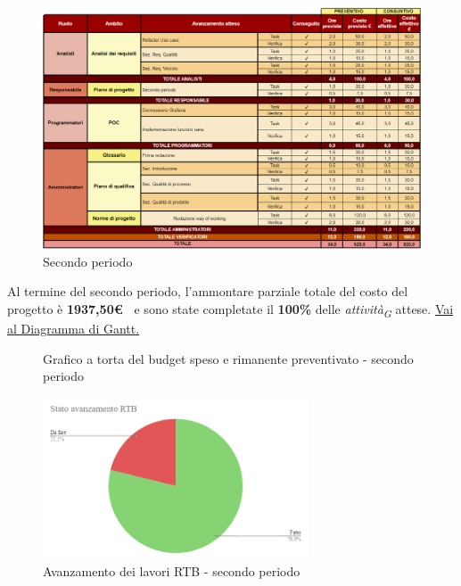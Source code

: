\begin{figure}[H]
    \centering
    \includegraphics[width=\linewidth, height=0.9\textheight, keepaspectratio]{../Images/periodo2.PNG}
    \caption{Secondo periodo}
    \label{fig:Secondo_periodo}
\end{figure}

Al termine del secondo periodo, l'ammontare parziale totale del costo del progetto è \textbf{ 1937,50\euro\ } e sono state completate il \textbf{100\%} delle \textit{attività}\textsubscript{\textit{G}} attese.
\href{https://github.com/orgs/ByteOps-swe/projects/3/views/1?sortedBy%5Bdirection%5D=asc&sortedBy%5BcolumnId%5D=64182560}{Vai al Diagramma di Gantt.}


\begin{figure}[H]
    \centering
    \begin{minipage}[b]{0.45\textwidth}
        \centering
        \caption{Grafico a torta del budget speso e rimanente preventivato - secondo periodo}
        \label{fig:Budget_speso_2}
    \end{minipage}
    
    \vspace{1cm}

    \begin{minipage}[b]{0.70\textwidth}
        \centering
        \includegraphics[width=0.7\textwidth]{../Images/avanzamento2Periodo.png}
        \caption{Avanzamento dei lavori RTB - secondo periodo}
        \label{fig:Avanzamento_RTB_2}
    \end{minipage}
\end{figure}

